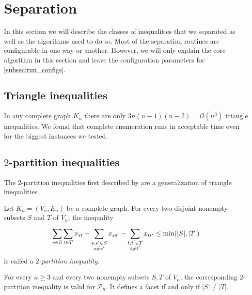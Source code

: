 \section{Separation}\label{sec:separation}
In this section we will describe the classes of inequalities that we separated as well as the algorithms used to do so.
Most of the separation routines are configurable in one way or another.
However, we will only explain the core algorithm in this section and leave the configuration parameters for \cref{subsec:run_configs}.

\subsection{Triangle inequalities}\label{subsec:triangle_separator}
In any complete graph $K_{n}$ there are only $3n(n-1)(n-2) = \mathcal{O}(n^{3})$ triangle inequalities.
We found that complete enumeration runs in acceptable time even for the biggest instances we tested.

\subsection{\texorpdfstring{$2$-partition}{2-partition} inequalities}\label{subsec:two_partition_separator}
The $2$-partition inequalities first described by \cite{grotschelFacetsCliquePartitioning1990} are a generalization of triangle inequalities.
\begin{definition}\label{def:2-partition_inequality}
	Let $K_{n} = (V_{n}, E_{n})$ be a complete graph.
	For every two disjoint nonempty subsets $S$ and $T$ of $V_{n}$, the inequality
	\begin{equation}\label{eq:2-partition_inequality}
		\sum_{s \in S}^{} \sum_{t \in T}^{} x_{st} - \sum_{\substack{s, s' \in S \\ s \neq s'}}^{} x_{ss'} - \sum_{\substack{t, t' \in T \\ t \neq t'}}^{} x_{tt'} \leq \operatorname{\text{min}}( \lvert S \rvert, \lvert T \rvert )
	\end{equation}
	is called a $2$\textit{-partition inequality}.
\end{definition}
\begin{theorem}
	For every $n \geq 3$ and every two nonempty subsets $S, T$ of $V_{n}$, the corresponding $2$-partition inequality is valid for $\mathscr{P}_{n}$.
	It defines a facet if and only if $\lvert  S \rvert \neq \lvert T \rvert$.
\end{theorem}

